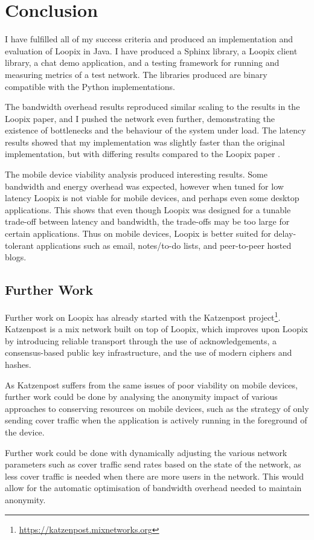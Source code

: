 \documentclass[final,dissertation.tex]{subfiles}
\begin{document}
\chapter{Conclusion}

I have fulfilled all of my success criteria and produced an implementation and evaluation of Loopix in Java. I have produced a Sphinx library, a Loopix client library, a chat demo application, and a testing framework for running and measuring metrics of a test network. The libraries produced are binary compatible with the Python implementations.

The bandwidth overhead results reproduced similar scaling to the results in the Loopix paper, and I pushed the network even further, demonstrating the existence of bottlenecks and the behaviour of the system under load. The latency results showed that my implementation was slightly faster than the original implementation, but with differing results compared to the Loopix paper \cite{piotrowska2017loopix}.

The mobile device viability analysis produced interesting results. Some bandwidth and energy overhead was expected, however when tuned for low latency Loopix is not viable for mobile devices, and perhaps even some desktop applications. This shows that even though Loopix was designed for a tunable trade-off between latency and bandwidth, the trade-offs may be too large for certain applications. Thus on mobile devices, Loopix is better suited for delay-tolerant applications such as email, notes/to-do lists, and peer-to-peer hosted blogs.

\section{Further Work}

Further work on Loopix has already started with the Katzenpost project\footnote{\url{https://katzenpost.mixnetworks.org}}. Katzenpost is a mix network built on top of Loopix, which improves upon Loopix by introducing reliable transport through the use of acknowledgements, a consensus-based public key infrastructure, and the use of modern ciphers and hashes. 

As Katzenpost suffers from the same issues of poor viability on mobile devices, further work could be done by analysing the anonymity impact of various approaches to conserving resources on mobile devices, such as the strategy of only sending cover traffic when the application is actively running in the foreground of the device.

Further work could be done with dynamically adjusting the various network parameters such as cover traffic send rates based on the state of the network, as less cover traffic is needed when there are more users in the network. This would allow for the automatic optimisation of bandwidth overhead needed to maintain anonymity.
\end{document}
